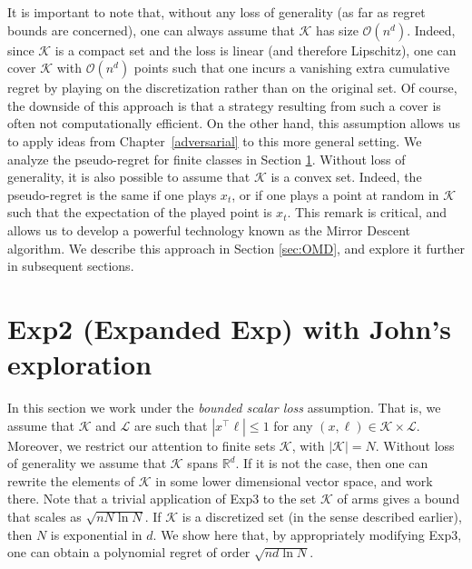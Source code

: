 \documentclass[11pt]{hackednow}
\newcommand{\R}{\mathbb{R}}
\newcommand{\cL}{\mathcal{L}}
\newcommand{\cK}{\mathcal{K}}
\newcommand{\scO}{\mathcal{O}}
\begin{document}
It is important to note that, without any loss of generality (as far as regret bounds are concerned), one can always assume that $\cK$ has size $\scO(n^d)$. Indeed, since $\cK$ is a compact set and the loss is linear (and therefore Lipschitz), one can cover $\cK$ with $\scO(n^d)$ points such that one incurs a vanishing extra cumulative regret by playing on the discretization rather than on the original set. Of course, the downside of this approach is that a strategy resulting from such a cover is often not computationally efficient. On the other hand, this assumption allows us to apply ideas from Chapter~\ref{adversarial} to this more general setting. We analyze the pseudo-regret for finite classes in Section \ref{sec:Exp2}. Without loss of generality, it is also possible to assume that $\cK$ is a convex set. Indeed, the pseudo-regret is the same if one plays $x_t$, or if one plays a point at random in $\cK$ such that the expectation of the played point is $x_t$. This remark is critical, and allows us to develop a powerful technology known as the Mirror Descent algorithm. We describe this approach in Section \ref{sec:OMD}, and explore it further in subsequent sections.

\section{Exp2 (Expanded Exp) with John's exploration} \label{sec:Exp2}
In this section we work under the {\em bounded scalar loss} assumption. That is, we assume that $\cK$ and $\cL$ are such that $|x^{\top} \ell| \leq 1$ for any $(x, \ell) \in \cK \times \cL$. Moreover, we restrict our attention to finite sets $\cK$, with $|\cK| = N$. Without loss of generality we assume that $\cK$ spans $\R^d$. If it is not the case, then one can rewrite the elements of $\cK$ in some lower dimensional vector space, and work there. Note that a trivial application of Exp3 to the set $\cK$ of arms gives a bound that scales as $\sqrt{n N\ln N}$. If $\cK$ is a discretized set (in the sense described earlier), then $N$ is exponential in $d$. We show here that, by appropriately modifying Exp3, one can obtain a polynomial regret of order $\sqrt{n d \ln N}$.
\end{document}
